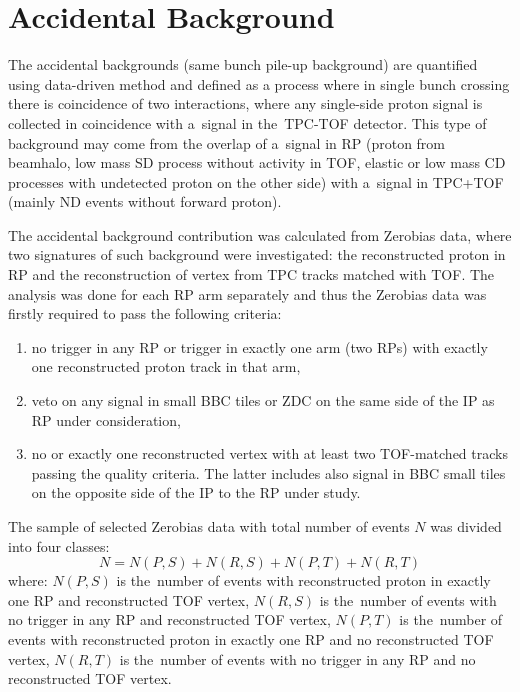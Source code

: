 \section{Accidental Background}\label{section:star_accidentals}
The accidental backgrounds (same bunch pile-up background) are quantified using data-driven method and defined as a process where in  single bunch crossing there is coincidence of two interactions, where any single-side proton signal is collected in coincidence with a~signal in the~TPC-TOF detector. %
This type of background may come from the overlap of a~signal in \ac{RP} (proton from beamhalo, low mass \ac{SD} process without activity in TOF, elastic or low mass \ac{CD} processes with undetected proton on the other side) with a~signal in TPC+TOF (mainly \ac{ND} events without forward proton).

The accidental background contribution was calculated  from Zerobias data, where two signatures of such background were investigated: the reconstructed proton in RP and the reconstruction of vertex from TPC tracks matched with TOF. The analysis was done for each RP arm separately and thus the 
 Zerobias data was firstly required to pass the following criteria:
\begin{enumerate}
	\item no trigger in any RP or trigger in exactly one arm (two RPs) with exactly one reconstructed proton track in that arm,
	\item veto on any signal in small BBC tiles or ZDC on the same  side of the IP as  RP under consideration,
	\item no or exactly one reconstructed vertex with at least two TOF-matched tracks passing the quality criteria. The latter includes also signal in BBC small tiles on the opposite side of the IP to the RP under study. 
\end{enumerate}
 The sample of selected Zerobias data with total  number  of events $N$ was divided into four classes:
\begin{equation}
N=N(P,S)+N(R,S)+N(P,T)+N(R,T)
\label{eq:accidentalSTAR_N}
\end{equation}
where: $N(P,S)$ is the~number of events with reconstructed proton in exactly one RP and reconstructed TOF vertex, $N(R,S)$  is the~number of events with no trigger in any RP and reconstructed TOF vertex, $N(P,T)$ is the~number of events with reconstructed proton in exactly one RP and no reconstructed TOF vertex, $N(R,T)$ is the~number of events with no trigger in any RP and no reconstructed TOF vertex.\\

